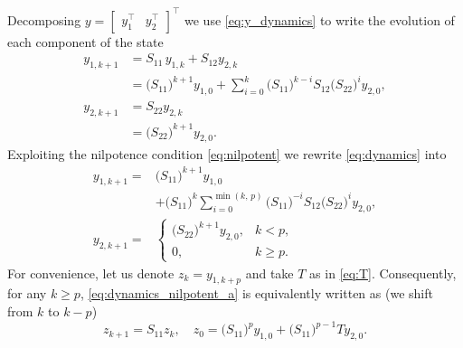 \documentclass[10pt,a4paper]{amsart}
\newcommand{\bbm}{\begin{bmatrix}}
\newcommand{\ebm}{\end{bmatrix}}
\begin{document}
Decomposing $y=\bbm y_1^\top & y_2^\top \ebm^\top$ we use \eqref{eq:y_dynamics} to write the evolution of each component of the state
\begin{subequations}
\label{eq:dynamics}
    \begin{align}
        \nonumber y_{1, k+1} &= S_{11}\,y_{1, k} + S_{12}y_{2, k}\\
        &=\bigl(S_{11}\bigr)^{k+1}y_{1,0}+\sum\limits_{i=0}^k \bigl(S_{11}\bigr)^{k-i}S_{12}\bigl(S_{22}\bigr)^{i}y_{2,0},\\
        \nonumber y_{2, k+1} &= S_{22}y_{2, k}\\
        &=\bigl(S_{22}\bigr)^{k+1}y_{2,0}.
    \end{align}
\end{subequations}
Exploiting the nilpotence condition \eqref{eq:nilpotent} we rewrite \eqref{eq:dynamics} into
\begin{subequations}
\label{eq:dynamics_nilpotent}
    \begin{align}
        \nonumber y_{1, k+1} =&  \bigl(S_{11}\bigr)^{k+1}y_{1,0}\\
        &+          \label{eq:dynamics_nilpotent_a}\bigl(S_{11}\bigr)^{k}\sum\limits_{i=0}^{\min(k,\, p)} \bigl(S_{11}\bigr)^{-i}S_{12}\bigl(S_{22}\bigr)^{i}y_{2,0},\\
        \label{eq:dynamics_nilpotent_b}y_{2, k+1} =& \begin{cases}\bigl(S_{22}\bigr)^{k+1}y_{2,0}, & k<p,\\
        0, & k\geq p.
        \end{cases}
    \end{align}
\end{subequations}
For convenience, let us denote $z_k=y_{1,k+p}$ and take $T$ as in \eqref{eq:T}. Consequently, for any $k\geq p$, \eqref{eq:dynamics_nilpotent_a} is equivalently written as (we shift from $k$ to $k-p$)
\begin{equation}
\label{eq:z}
    z_{k+1} = S_{11} z_k, \quad z_0=\bigl(S_{11}\bigr)^py_{1,0}+\bigl(S_{11}\bigr)^{p-1}Ty_{2,0}.
\end{equation}
\end{document}

